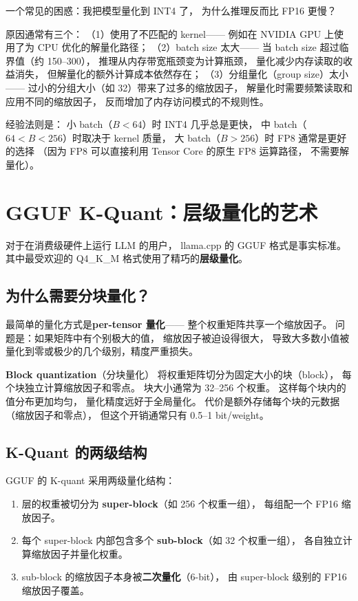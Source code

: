 \begin{whybox}[为什么量化后的模型速度有时反而更慢？]
一个常见的困惑：我把模型量化到 INT4 了，
为什么推理反而比 FP16 更慢？

原因通常有三个：
（1）使用了不匹配的 kernel——
例如在 NVIDIA GPU 上使用了为 CPU 优化的解量化路径；
（2）batch size 太大——
当 batch size 超过临界值（约 150--300），
推理从内存带宽瓶颈变为计算瓶颈，
量化减少内存读取的收益消失，
但解量化的额外计算成本依然存在；
（3）分组量化（group size）太小——
过小的分组大小（如 32）带来了过多的缩放因子，
解量化时需要频繁读取和应用不同的缩放因子，
反而增加了内存访问模式的不规则性。

经验法则是：
小 batch（$B < 64$）时 INT4 几乎总是更快，
中 batch（$64 < B < 256$）时取决于 kernel 质量，
大 batch（$B > 256$）时 FP8 通常是更好的选择
（因为 FP8 可以直接利用 Tensor Core 的原生 FP8 运算路径，
不需要解量化）。
\end{whybox}


\section{GGUF K-Quant：层级量化的艺术}

对于在消费级硬件上运行 LLM 的用户，
llama.cpp 的 GGUF 格式是事实标准。
其中最受欢迎的 Q4\_K\_M 格式使用了精巧的\textbf{层级量化}。

\subsection{为什么需要分块量化？}

最简单的量化方式是\textbf{per-tensor 量化}——
整个权重矩阵共享一个缩放因子。
问题是：如果矩阵中有个别极大的值，
缩放因子被迫设得很大，
导致大多数小值被量化到零或极少的几个级别，精度严重损失。

\textbf{Block quantization}（分块量化）
将权重矩阵切分为固定大小的块（block），
每个块独立计算缩放因子和零点。
块大小通常为 32--256 个权重。
这样每个块内的值分布更加均匀，
量化精度远好于全局量化。
代价是额外存储每个块的元数据（缩放因子和零点），
但这个开销通常只有 0.5--1 bit/weight。

\subsection{K-Quant 的两级结构}

GGUF 的 K-quant 采用两级量化结构：
\begin{enumerate}[noitemsep]
  \item 层的权重被切分为 \textbf{super-block}（如 256 个权重一组），
        每组配一个 FP16 缩放因子。
  \item 每个 super-block 内部包含多个 \textbf{sub-block}（如 32 个权重一组），
        各自独立计算缩放因子并量化权重。
  \item sub-block 的缩放因子本身被\textbf{二次量化}（6-bit），
        由 super-block 级别的 FP16 缩放因子覆盖。
\end{enumerate}

